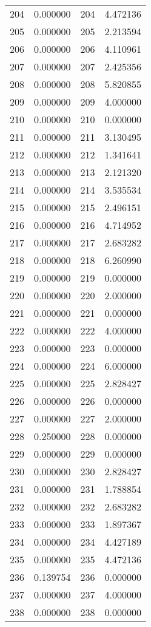 \documentclass[12pt]{article}
\begin{document}
\begin{longtable}{@{}cccc@{}}
204 & 0.000000 & 204 & 4.472136 \\
205 & 0.000000 & 205 & 2.213594 \\
206 & 0.000000 & 206 & 4.110961 \\
207 & 0.000000 & 207 & 2.425356 \\
208 & 0.000000 & 208 & 5.820855 \\
209 & 0.000000 & 209 & 4.000000 \\
210 & 0.000000 & 210 & 0.000000 \\
211 & 0.000000 & 211 & 3.130495 \\
212 & 0.000000 & 212 & 1.341641 \\
213 & 0.000000 & 213 & 2.121320 \\
214 & 0.000000 & 214 & 3.535534 \\
215 & 0.000000 & 215 & 2.496151 \\
216 & 0.000000 & 216 & 4.714952 \\
217 & 0.000000 & 217 & 2.683282 \\
218 & 0.000000 & 218 & 6.260990 \\
219 & 0.000000 & 219 & 0.000000 \\
220 & 0.000000 & 220 & 2.000000 \\
221 & 0.000000 & 221 & 0.000000 \\
222 & 0.000000 & 222 & 4.000000 \\
223 & 0.000000 & 223 & 0.000000 \\
224 & 0.000000 & 224 & 6.000000 \\
225 & 0.000000 & 225 & 2.828427 \\
226 & 0.000000 & 226 & 0.000000 \\
227 & 0.000000 & 227 & 2.000000 \\
228 & 0.250000 & 228 & 0.000000 \\
229 & 0.000000 & 229 & 0.000000 \\
230 & 0.000000 & 230 & 2.828427 \\
231 & 0.000000 & 231 & 1.788854 \\
232 & 0.000000 & 232 & 2.683282 \\
233 & 0.000000 & 233 & 1.897367 \\
234 & 0.000000 & 234 & 4.427189 \\
235 & 0.000000 & 235 & 4.472136 \\
236 & 0.139754 & 236 & 0.000000 \\
237 & 0.000000 & 237 & 4.000000 \\
238 & 0.000000 & 238 & 0.000000 \\

\end{longtable}
\end{document}
